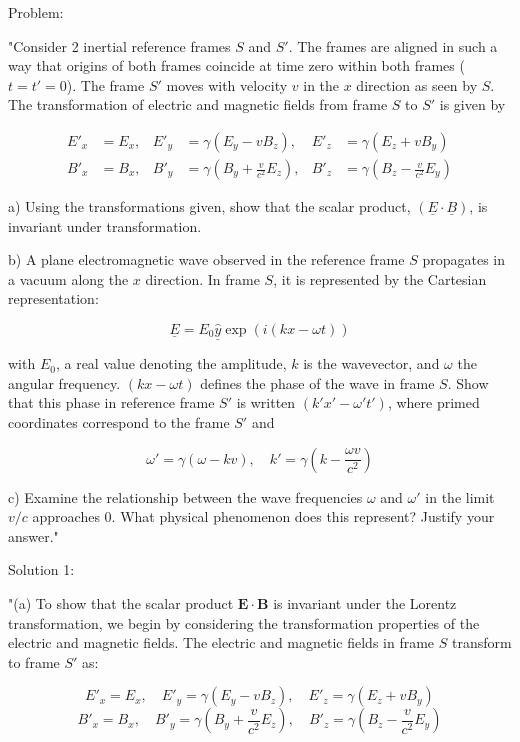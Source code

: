 Problem:

"Consider 2 inertial reference frames \( S \) and \( S' \). The frames are aligned in such a way that origins of both frames coincide at time zero within both frames (\( t = t' = 0 \)). The frame \( S' \) moves with velocity \( v \) in the \( x \) direction as seen by \( S \). The transformation of electric and magnetic fields from frame \( S \) to \( S' \) is given by 

\[
\begin{aligned}
E'_{x} &= E_{x}, & E'_{y} &= \gamma(E_{y} - vB_{z}), & E'_{z} &= \gamma(E_{z} + vB_{y}) \\
B'_{x} &= B_{x}, & B'_{y} &= \gamma(B_{y} + \frac{v}{c^{2}} E_{z}), & B'_{z} &= \gamma(B_{z} - \frac{v}{c^{2}} E_{y})
\end{aligned}
\]

a) Using the transformations given, show that the scalar product, \( (\underline{E} \cdot \underline{B}) \), is invariant under transformation.

b) A plane electromagnetic wave observed in the reference frame \( S \) propagates in a vacuum along the \( x \) direction. In frame \( S \), it is represented by the Cartesian representation: 

\[ \underline{E} = E_{0} \hat{\underline{y}} \exp(i(kx - \omega t)) \]

with \( E_{0} \), a real value denoting the amplitude, \( k \) is the wavevector, and \( \omega \) the angular frequency. \( (kx - \omega t) \) defines the phase of the wave in frame \( S \). Show that this phase in reference frame \( S' \) is written \( (k'x' - \omega' t') \), where primed coordinates correspond to the frame \( S' \) and

\[ \omega' = \gamma(\omega - kv), \quad k' = \gamma(k - \frac{\omega v}{c^{2}}) \]

c) Examine the relationship between the wave frequencies \( \omega \) and \( \omega' \) in the limit \( v/c \) approaches \( 0 \). What physical phenomenon does this represent? Justify your answer."

Solution 1: 

"(a) To show that the scalar product \( \mathbf{E} \cdot \mathbf{B} \) is invariant under the Lorentz transformation, we begin by considering the transformation properties of the electric and magnetic fields. The electric and magnetic fields in frame \( S \) transform to frame \( S' \) as:

\[
E'_x = E_x, \quad E'_y = \gamma (E_y - v B_z), \quad E'_z = \gamma (E_z + v B_y)
\]
\[
B'_x = B_x, \quad B'_y = \gamma \left( B_y + \frac{v}{c^2} E_z \right), \quad B'_z = \gamma \left( B_z - \frac{v}{c^2} E_y \right)
\]

